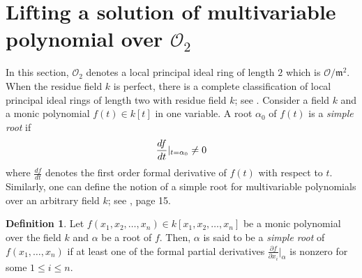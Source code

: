 \documentclass[10pt,twoside]{amsart}
\newcommand{\R}{\mathcal{O}_2}
\theoremstyle{definition}
\newtheorem{definition}[theorem]{Definition}
\theoremstyle{definition}
\begin{document}
\section{Lifting a solution of multivariable polynomial over $\R$}{\label{mult-lift}}

In this section, $\R$ denotes a local principal ideal ring of length $2$ which is $\mathcal{O}/ \mathfrak{m}^2$. When the residue field $k$ is perfect, there is a complete classification of local principal ideal rings of length two with residue field $k$; see \cite[Theorem 2.1]{simlengthtwoamri}. Consider a field $k$ and a monic polynomial $f(t) \in k[t]$ in one variable. A root $\alpha_0$ of $f(t)$ is a \emph{simple root} if $$\frac{df}{dt}\Large\vert_{t=\alpha_0}\neq 0$$  where $\frac{df}{dt}$ denotes the first order formal derivative of $f(t)$ with respect to $t$. Similarly, one can define the notion of a simple root for multivariable polynomials over an arbitrary field $k$; see \cite{JPSERREArithmatic}, page 15.

\begin{definition}
Let $f(x_1,x_2,\ldots,x_n)\in k[x_1,x_2,\ldots,x_n]$ be a monic polynomial over the field $k$ and $\alpha$ be a root of $f$. Then, $\alpha$ is said to be a \emph{simple root} of $f(x_1,\ldots, x_n)$ if at least one of the formal partial derivatives $\frac{\partial f}{\partial x_i}|_{\alpha}$ is nonzero for some $1\leq i \leq n$. 
\end{definition}
\end{document}
